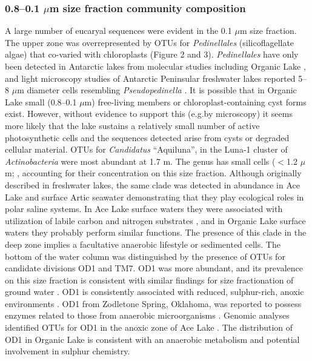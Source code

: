 {{\subsubsection{0.8–0.1 $\mu$m size fraction community composition}
A large number of eucaryal sequences were evident in the 0.1 $\mu$m size fraction. 
The upper zone was overrepresented by \acp{OTU} for \emph{Pedinellales} (silicoflagellate algae) that co-varied with chloroplasts (Figure 2 and 3). 
\emph{Pedinellales} have only been detected in Antarctic lakes from molecular studies \cite{Unrein2005, Lauro2011} including Organic Lake \cite{Yau2011}, and light microscopy studies of Antarctic Peninsular freshwater lakes reported 5--8 $\mu$m diameter cells resembling \emph{Pseudopedinella} \cite{Unrein2005}. 
It is possible that in Organic Lake small (0.8–0.1 $\mu$m) free-living members or chloroplast-containing cyst forms \cite{Thomsen1988} exist. 
However, without evidence to support this (e.g.by microscopy) it seems more likely that the lake sustains a relatively small number of active photosynthetic cells and the sequences detected arise from cysts or degraded cellular material.
\acp{OTU} for \emph{Candidatus} “Aquiluna”, in the Luna-1 cluster of \emph{Actinobacteria} \cite{Hahn2004, Hahn2009} were most abundant at 1.7 m. 
The genus has small cells ($<$1.2 $\mu$m; \cite{Hahn2009}, accounting for their concentration on this size fraction. 
Although originally described in freshwater lakes, the same clade was detected in abundance in Ace Lake \cite{Lauro2011} and surface Artic seawater \cite{Kang2012} demonstrating that they play ecological roles in polar saline systems. 
In Ace Lake surface waters they were associated with utilization of labile carbon and nitrogen substrates \cite{Lauro2011}, and in Organic Lake surface waters they probably perform similar functions. 
The presence of this clade in the deep zone implies a facultative anaerobic lifestyle or sedimented cells. 
The bottom of the water column was distinguished by the presence of \acp{OTU} for candidate divisions OD1 and TM7. 
OD1 was more abundant, and its prevalence on this size fraction is consistent with similar findings for size fractionation of ground water \cite{Miyoshi2005}. 
OD1 is consistently associated with reduced, sulphur-rich, anoxic environments \cite{Harris2004, Elshahed2005}. 
OD1 from Zodletone Spring, Oklahoma, was reported to possess enzymes related to those from anaerobic microorganisms \cite{Elshahed2005}. 
Genomic analyses identified \acp{OTU} for OD1 in the anoxic zone of Ace Lake \cite{Lauro2011}. 
The distribution of OD1 in Organic Lake is consistent with an anaerobic metabolism and potential involvement in sulphur chemistry. 


}}
